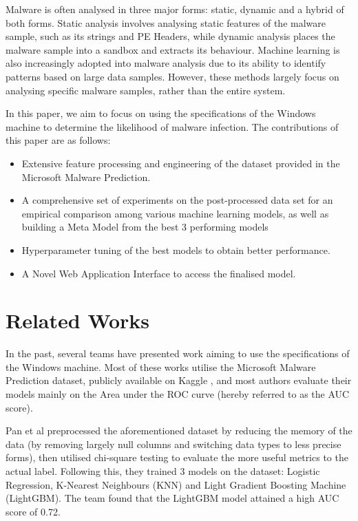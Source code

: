 \documentclass[pdflatex,sn-basic,Numbered]{sn-jnl}%
\theoremstyle{thmstyleone}%
\theoremstyle{thmstyletwo}%
\theoremstyle{thmstylethree}%
\begin{document}
\par
Malware is often analysed in three major forms: static, dynamic and a hybrid of both forms. Static analysis involves analysing static features of the malware sample, such as its strings and PE Headers, while dynamic analysis places the malware sample into a sandbox and extracts its behaviour. Machine learning is also increasingly adopted into malware analysis due to its ability to identify patterns based on large data samples. However, these methods largely focus on analysing specific malware samples, rather than the entire system.

\par
In this paper, we aim to focus on using the specifications of the Windows machine to determine the likelihood of malware infection. The contributions of this paper are as follows:
\begin{itemize}
\item  Extensive feature processing and engineering of the dataset provided in the Microsoft Malware Prediction.
\item A comprehensive set of experiments on the post-processed data set for an empirical comparison among various machine learning models, as well as building a Meta Model from the best 3 performing models
\item Hyperparameter tuning of the best models to obtain better performance.
\item A Novel Web Application Interface to access the finalised model.
\end{itemize}

\section{Related Works}

In the past, several teams have presented work aiming to use the specifications of the Windows machine. Most of these works \cite{iop2020,shahini2019,sokolov2021} utilise the Microsoft Malware Prediction dataset, publicly available on Kaggle \cite{microsoft-malware-prediction}, and most authors evaluate their models mainly on the Area under the ROC curve (hereby referred to as the AUC score).

Pan et al \cite{iop2020} preprocessed the aforementioned dataset by reducing the memory of the data (by removing largely null columns and switching data types to less precise forms), then utilised chi-square testing to evaluate the more useful metrics to the actual label. Following this, they trained 3 models on the dataset: Logistic Regression, K-Nearest Neighbours (KNN) and Light Gradient Boosting Machine (LightGBM). The team found that the LightGBM model attained a high AUC score of 0.72.
\end{document}
